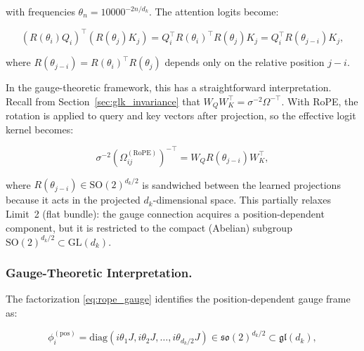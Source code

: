 \documentclass[twoside,11pt]{article}
\begin{document}
with frequencies $\theta_n = 10000^{-2n/d_k}$. The attention logits become:

\begin{equation}
(R(\theta_i) Q_i)^\top (R(\theta_j) K_j) = Q_i^\top R(\theta_i)^\top R(\theta_j) K_j = Q_i^\top R(\theta_{j-i}) K_j,
\label{eq:rope_relative}
\end{equation}

where $R(\theta_{j-i}) = R(\theta_i)^\top R(\theta_j)$ depends only on the relative position $j - i$.

In the gauge-theoretic framework, this has a straightforward interpretation. Recall from Section~\ref{sec:glk_invariance} that $W_Q W_K^\top = \sigma^{-2}\Omega^{-\top}$. With RoPE, the rotation is applied to query and key vectors after projection, so the effective logit kernel becomes:

\begin{equation}
\sigma^{-2}(\Omega_{ij}^{(\mathrm{RoPE})})^{-\top} = W_Q R(\theta_{j-i}) W_K^\top,
\label{eq:rope_gauge}
\end{equation}

where $R(\theta_{j-i}) \in \mathrm{SO}(2)^{d_k/2}$ is sandwiched between the learned projections because it acts in the projected $d_k$-dimensional space. This partially relaxes Limit~2 (flat bundle): the gauge connection acquires a position-dependent component, but it is restricted to the compact (Abelian) subgroup $\mathrm{SO}(2)^{d_k/2} \subset \mathrm{GL}(d_k)$.

\subsubsection{Gauge-Theoretic Interpretation.}

The factorization \eqref{eq:rope_gauge} identifies the position-dependent gauge frame as:

\begin{equation}
\phi_i^{(\mathrm{pos})} = \mathrm{diag}(i\theta_1 J, i\theta_2 J, \ldots, i\theta_{d_k/2} J) \in \mathfrak{so}(2)^{d_k/2} \subset \mathfrak{gl}(d_k),
\label{eq:rope_lie_algebra}
\end{equation}
\end{document}
